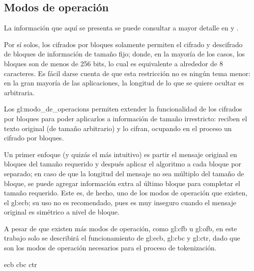 %
%

\subsection{Modos de operación}
\label{sec:modos}

La información que aquí se presenta se puede consultar a mayor detalle en
\cite{modos_de_operacion} y \cite{menezes}.

Por sí solos, los cifrados por bloques solamente permiten el cifrado y
descifrado de bloques de información de tamaño fijo; donde, en la mayoría de
los casos, los bloques son de menos de 256 bits, lo cual es equivalente a
alrededor de 8 caracteres. Es fácil darse cuenta de que esta restricción no es
ningún tema menor: en la gran mayoría de las aplicaciones, la longitud de lo
que se quiere ocultar es arbitraria.

Los \glspl{gl:modo_de_operacion} permiten extender la funcionalidad de los
cifrados por bloques para poder aplicarlos a información de tamaño irrestricto:
reciben el texto original (de tamaño arbitrario) y lo cifran, ocupando en el
proceso un cifrado por bloques.

Un primer enfoque (y quizás el más intuitivo) es partir el mensaje original
en bloques del tamaño requerido y después aplicar el algoritmo a cada bloque
por separado; en caso de que la longitud del mensaje no sea múltiplo del
tamaño de bloque, se puede agregar información extra al último bloque para
completar el tamaño requerido. Este es, de hecho, uno de los modos de operación
que existen, el \gls{gl:ecb}; su uso no es recomendado, pues es muy inseguro
cuando el mensaje original es simétrico a nivel de bloque.

A pesar de que existen más modos de operación, como \gls{gl:cfb}
u \gls{gl:ofb}, en este trabajo solo se describirá el funcionamiento de
\gls{gl:ecb}, \gls{gl:cbc} y \gls{gl:ctr}, dado que son los modos de operación
necesarios para el proceso de tokenización.



{ecb}
{cbc}
{ctr}
